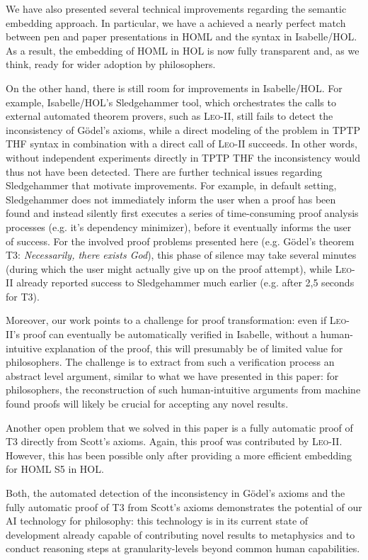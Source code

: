\documentclass{article}
\begin{document}
We have also presented several technical improvements regarding the
semantic embedding approach. In particular, we have a achieved a
nearly perfect match between pen and paper presentations in HOML and
the syntax in Isabelle/HOL. As a result, the embedding of HOML in HOL
is now fully transparent and, as we think, ready for wider adoption by
philosophers.

On the other hand, there is still room for improvements in
Isabelle/HOL. For example, Isabelle/HOL's Sledgehammer tool, which
orchestrates the calls to external automated theorem provers, such as
\textsc{Leo-II}, still fails to detect the inconsistency of G\"odel's
axioms, while a direct modeling of the problem in TPTP THF syntax in
combination with a direct call of \textsc{Leo-II} succeeds. In other
words, without independent experiments directly in TPTP THF the
inconsistency would thus not have been detected. There are further
technical issues regarding Sledgehammer that motivate
improvements. For example, in default setting, Sledgehammer does not
immediately inform the user when a proof has been found and instead silently
 first executes a series of time-consuming proof analysis processes (e.g. it's
dependency minimizer), before it eventually informs the user of success. For the
involved proof problems presented here (e.g. G\"odel's theorem T3:
\textit{Necessarily, there exists God}), this phase of silence may
take several minutes (during which the user might actually give up on
the proof attempt), while \textsc{Leo-II} already reported success to
Sledgehammer much earlier (e.g. after 2,5 seconds for T3).

Moreover, our work points to a challenge for proof transformation:
even if \textsc{Leo-II}'s proof can eventually be automatically
verified in Isabelle, without a human-intuitive explanation of the
proof, this will presumably be of limited value for philosophers.  The
challenge is to extract from such a verification process an abstract
level argument, similar to what we have presented in this paper: for
philosophers, the reconstruction of such human-intuitive arguments
from machine found proofs will likely be crucial for accepting any
novel results.

Another open problem that we solved in this paper is a fully automatic
proof of T3 directly from Scott's axioms. Again, this proof was
contributed by \textsc{Leo-II}. However, this has been possible only
after providing a more efficient embedding for HOML S5 in HOL. 

Both, the automated detection of the inconsistency in G\"odel's axioms
and the fully automatic proof of T3 from Scott's axioms demonstrates
the potential of our AI technology for philosophy: this technology is
in its current state of development already capable of contributing novel results to
metaphysics and to conduct reasoning steps at granularity-levels
beyond common human capabilities.
\end{document}
